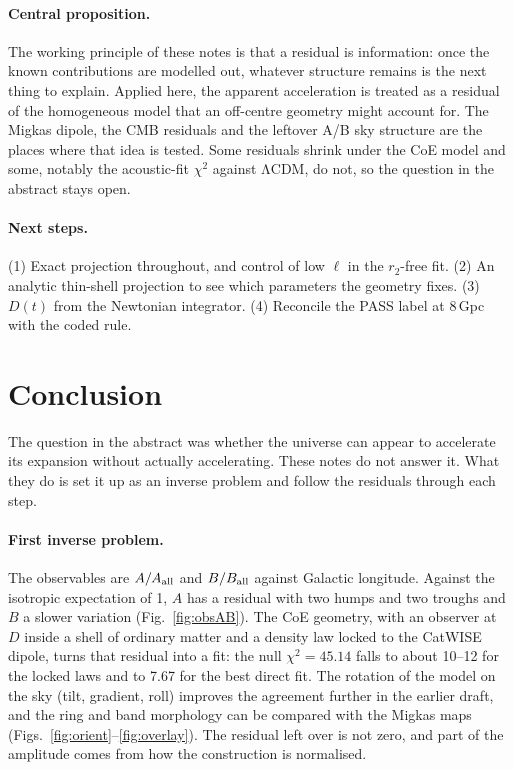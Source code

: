 \documentclass[10pt,twocolumn]{article}
\begin{document}
\paragraph{Central proposition.} The working principle of these notes is that a residual is information: once the known contributions are modelled out, whatever structure remains is the next thing to explain. Applied here, the apparent acceleration is treated as a residual of the homogeneous model that an off-centre geometry might account for. The Migkas dipole, the CMB residuals and the leftover A/B sky structure are the places where that idea is tested. Some residuals shrink under the CoE model and some, notably the acoustic-fit $\chi^2$ against ΛCDM, do not, so the question in the abstract stays open.

\paragraph{Next steps.} (1) Exact projection throughout, and control of low $\ell$ in the $r_2$-free fit. (2) An analytic thin-shell projection to see which parameters the geometry fixes. (3) $D(t)$ from the Newtonian integrator. (4) Reconcile the PASS label at 8\,Gpc with the coded rule.

\section{Conclusion}\label{sec:concl}
The question in the abstract was whether the universe can appear to accelerate its expansion without actually accelerating. These notes do not answer it. What they do is set it up as an inverse problem and follow the residuals through each step.

\paragraph{First inverse problem.} The observables are $A/A_{\rm all}$ and $B/B_{\rm all}$ against Galactic longitude. Against the isotropic expectation of 1, $A$ has a residual with two humps and two troughs and $B$ a slower variation (Fig.~\ref{fig:obsAB}). The CoE geometry, with an observer at $D$ inside a shell of ordinary matter and a density law locked to the CatWISE dipole, turns that residual into a fit: the null $\chi^2=45.14$ falls to about 10--12 for the locked laws and to 7.67 for the best direct fit. The rotation of the model on the sky (tilt, gradient, roll) improves the agreement further in the earlier draft, and the ring and band morphology can be compared with the Migkas maps (Figs.~\ref{fig:orient}--\ref{fig:overlay}). The residual left over is not zero, and part of the amplitude comes from how the construction is normalised.
\end{document}
